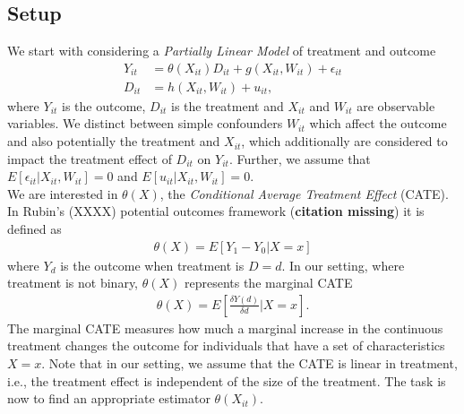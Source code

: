 \subsection{Setup} \label{sec:dml-idea}
We start with considering a \textit{Partially Linear Model} of treatment and outcome 
\begin{align}
    Y_{it}&=\theta(X_{it})D_{it}+g(X_{it}, W_{it})+\epsilon_{it} \label{eq:plm1}\\
    D_{it}&=h(X_{it}, W_{it})+u_{it}, \label{eq:plm2}
\end{align}
where $Y_{it}$ is the outcome, $D_{it}$ is the treatment and $X_{it}$ and $W_{it}$ are observable variables. We distinct between simple confounders $W_{it}$ which affect the outcome and also potentially the treatment and $X_{it}$, which additionally are considered to impact the treatment effect of $D_{it}$ on $Y_{it}$. Further, we assume that $E[\epsilon_{it}|X_{it}, W_{it}]=0$ and $E[u_{it}|X_{it}, W_{it}]=0$. \\ 
We are interested in $\theta(X)$, the \textit{Conditional Average Treatment Effect} (CATE). In Rubin's (XXXX) potential outcomes framework (\textbf{citation missing}) it is defined as 
\begin{align*}
    \theta(X)=E[Y_1 - Y_0 | X=x]
\end{align*}
where $Y_d$ is the outcome when treatment is $D=d$. In our setting, where treatment is not binary, $\theta(X)$ represents the marginal CATE
\begin{align*}
    \theta(X)=E\left[\frac{\delta Y(d)}{\delta d} \bigg| X=x\right].
\end{align*}
The marginal CATE measures how much a marginal increase in the continuous treatment changes the outcome for individuals that have a set of characteristics $X=x$. Note that in our setting, we assume that the CATE is linear in treatment, i.e., the treatment effect is independent of the size of the treatment. The task is now to find an appropriate estimator ${\theta}(X_{it})$.

